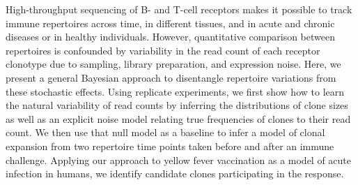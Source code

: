 High-throughput sequencing of B- and T-cell receptors makes it possible to track immune repertoires across time, in different tissues, and in acute and chronic diseases or in healthy individuals. However, quantitative comparison between repertoires is confounded by variability in the read count of each receptor clonotype due to sampling, library preparation, and expression noise. Here, we present a general Bayesian approach to disentangle repertoire variations from these stochastic effects. Using replicate experiments, we first show how to learn the natural variability of read counts by inferring the distributions of clone sizes as well as an explicit noise model relating true frequencies of clones to their read count. We then use that null model as a baseline to infer a model of clonal expansion from two repertoire time points taken before and after an immune challenge. Applying our approach to yellow fever vaccination as a model of acute infection in humans, we identify candidate clones participating in the response.
